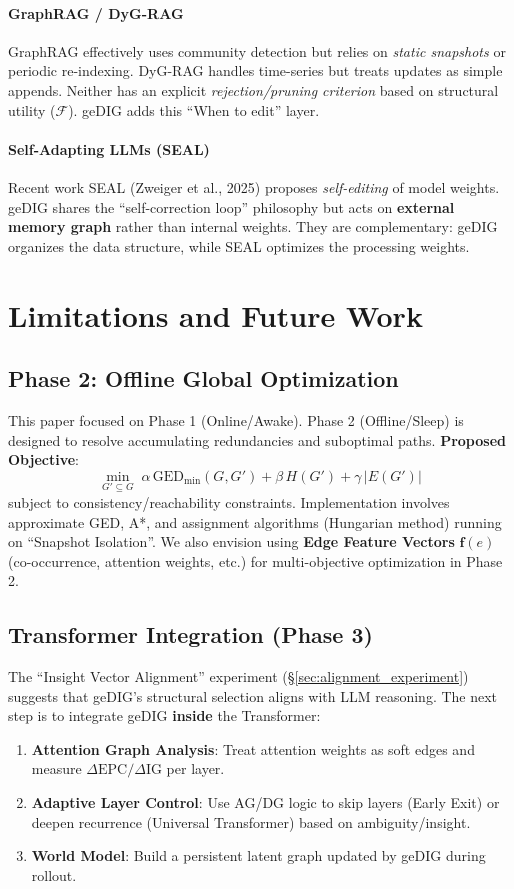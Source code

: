 \documentclass[12pt]{article}
\newcommand{\F}{\mathcal{F}}
\begin{document}
\paragraph{GraphRAG / DyG-RAG}\;
GraphRAG effectively uses community detection but relies on \emph{static snapshots} or periodic re-indexing. DyG-RAG handles time-series but treats updates as simple appends. Neither has an explicit \emph{rejection/pruning criterion} based on structural utility ($\F$). geDIG adds this ``When to edit'' layer.

\paragraph{Self-Adapting LLMs (SEAL)}\;
Recent work SEAL (Zweiger et al., 2025) proposes \emph{self-editing} of model weights. geDIG shares the ``self-correction loop'' philosophy but acts on \textbf{external memory graph} rather than internal weights. They are complementary: geDIG organizes the data structure, while SEAL optimizes the processing weights.

\section{Limitations and Future Work}
\label{sec:limits_future}

\subsection{Phase 2: Offline Global Optimization}
This paper focused on Phase 1 (Online/Awake). Phase 2 (Offline/Sleep) is designed to resolve accumulating redundancies and suboptimal paths.
\textbf{Proposed Objective}:
\[
  \min_{G'\subseteq G} \; \alpha\,\mathrm{GED}_{\min}(G,G') + \beta\,H(G') + \gamma\,|E(G')|
\]
subject to consistency/reachability constraints.
Implementation involves approximate GED, A*, and assignment algorithms (Hungarian method) running on ``Snapshot Isolation''.
We also envision using \textbf{Edge Feature Vectors} $\mathbf{f}(e)$ (co-occurrence, attention weights, etc.) for multi-objective optimization in Phase 2.

\subsection{Transformer Integration (Phase 3)}
The ``Insight Vector Alignment'' experiment (\S\ref{sec:alignment_experiment}) suggests that geDIG's structural selection aligns with LLM reasoning.
The next step is to integrate geDIG \textbf{inside} the Transformer:
\begin{enumerate}
    \item \textbf{Attention Graph Analysis}: Treat attention weights as soft edges and measure $\Delta\mathrm{EPC}/\Delta\mathrm{IG}$ per layer.
    \item \textbf{Adaptive Layer Control}: Use AG/DG logic to skip layers (Early Exit) or deepen recurrence (Universal Transformer) based on ambiguity/insight.
    \item \textbf{World Model}: Build a persistent latent graph updated by geDIG during rollout.
\end{enumerate}
\end{document}
